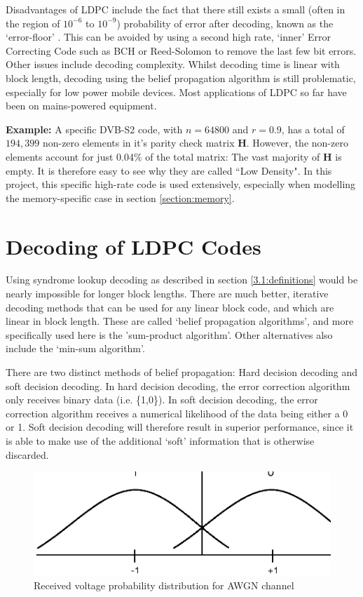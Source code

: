 \documentclass[11pt]{article}
\numberwithin{equation}{subsection}
\begin{document}
Disadvantages of LDPC include the fact that there still exists a small (often in the region of $10^{-6}$ to $10^{-9}$) probability of error after decoding, known as the `error-floor' \cite{richardson2003error}. This can be avoided by using a second high rate, `inner' Error Correcting Code such as BCH or Reed-Solomon to remove the last few bit errors. Other issues include decoding complexity. Whilst decoding time is linear with block length, decoding using the belief propagation algorithm is still problematic, especially for low power mobile devices. Most applications of LDPC so far have been on mains-powered equipment.


\textbf{Example:}
A specific DVB-S2 code, with $n = 64800$ and $r = 0.9$, has a total of $194,399$ non-zero elements in it's parity check matrix $\mathbf{H}$. However, the non-zero elements account for just 0.04\% of the total matrix: The vast majority of $\mathbf{H}$ is empty. It is therefore easy to see why they are called ``Low Density". In this project, this specific high-rate code is used extensively, especially when modelling the memory-specific case in section \ref{section:memory}.


\section{Decoding of LDPC Codes} \label{decoding}
Using syndrome lookup decoding as described in section \ref{3.1:definitions} would be nearly impossible for longer block lengths. There are much better, iterative decoding methods that can be used for any linear block code, and which are linear in block length. These are called `belief propagation algorithms', and more specifically used here is the 'sum-product algorithm'. Other alternatives also include the `min-sum algorithm'.

There are two distinct methods of belief propagation: Hard decision decoding and soft decision decoding. In hard decision decoding, the error correction algorithm only receives binary data (i.e. \{1,0\}). In soft decision decoding, the error correction algorithm receives a numerical likelihood of the data being either a 0 or 1. Soft decision decoding will therefore result in superior performance, since it is able to make use of the additional `soft' information that is otherwise discarded.

\begin{figure}[h]
\centering
\includegraphics{BPSK_channel_graph}
\caption{Received voltage probability distribution for AWGN channel}
\label{figure:awgn probability graph}
\end{figure}
\end{document}
